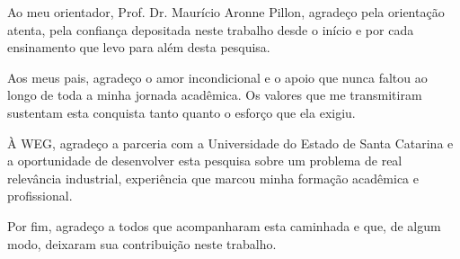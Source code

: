 \begin{agradecimentos}
Ao meu orientador, Prof. Dr. Maurício Aronne Pillon, agradeço pela orientação atenta, pela confiança depositada neste trabalho desde o início e por cada ensinamento que levo para além desta pesquisa.

Aos meus pais, agradeço o amor incondicional e o apoio que nunca faltou ao longo de toda a minha jornada acadêmica. Os valores que me transmitiram sustentam esta conquista tanto quanto o esforço que ela exigiu.

À WEG, agradeço a parceria com a Universidade do Estado de Santa Catarina e a oportunidade de desenvolver esta pesquisa sobre um problema de real relevância industrial, experiência que marcou minha formação acadêmica e profissional.

Por fim, agradeço a todos que acompanharam esta caminhada e que, de algum modo, deixaram sua contribuição neste trabalho.
\end{agradecimentos}
